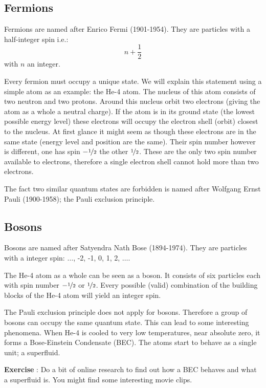 \documentclass[12pt,a4paper]{article}
\numberwithin{equation}{section}
\numberwithin{figure}{section}
\newcounter{Exercise}
\numberwithin{table}{section}
\begin{document}
\subsection{Fermions}
Fermions are named after Enrico Fermi (1901-1954). They are particles with a half-integer spin i.e.:
\begin{equation}
n + \frac{1}{2}
\end{equation}
with $n$ an integer.

Every fermion must occupy a unique state. We will explain this statement using a simple atom as an example: the He-4 atom. The nucleus of this atom consists of two neutron and two protons. Around this nucleus orbit two electrons (giving the atom as a whole a neutral charge). If the atom is in its ground state (the lowest possible energy level) these electrons will occupy the electron shell (orbit) closest to the nucleus. At first glance it might seem as though these electrons are in the same state (energy level and position are the same). Their spin number however is different, one has spin $-\nicefrac{1}{2}$ the other $\nicefrac{1}{2}$. These are the only two spin number available to electrons, therefore a single electron shell cannot hold more than two electrons.

The fact two similar quantum states are forbidden is named after Wolfgang Ernst Pauli (1900-1958); the Pauli exclusion principle.

\subsection{Bosons}
Bosons are named after Satyendra Nath Bose (1894-1974). They are particles with a integer spin: $\ldots$, -2, -1, 0, 1, 2, $\ldots$.

The He-4 atom as a whole can be seen as a boson. It consists of six particles each with spin number $-\nicefrac{1}{2}$ or $\nicefrac{1}{2}$. Every possible (valid) combination of the building blocks of the He-4 atom will yield an integer spin.

The Pauli exclusion principle does not apply for bosons. Therefore a group of bosons can occupy the same quantum state. This can lead to some interesting phenomena. When He-4 is cooled to very low temperatures, near absolute zero, it forms a Bose-Einstein Condensate (BEC). The atoms start to behave as a single unit; a superfluid.

\begin{shaded}
\textbf{Exercise \theExercise {}} : Do a bit of online research to find out how a BEC behaves and what a superfluid is. You might find some interesting movie clips.\end{shaded}
\end{document}
